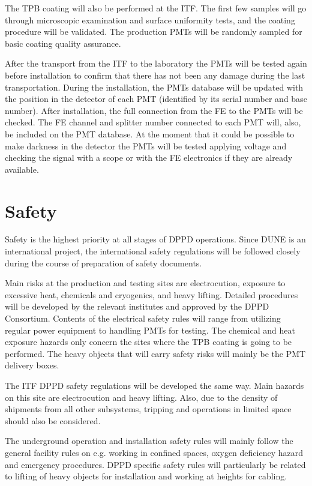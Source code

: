 The TPB coating will also be performed at the ITF. The first few samples will go through microscopic examination and surface uniformity tests, and the coating procedure will be validated. The production PMTs will be randomly sampled for basic coating quality assurance.

After the transport from the ITF to the laboratory the PMTs will be tested again before installation to confirm that there has not been any damage during the last transportation. During the installation, the PMTs database will be updated with the position in the detector of each PMT (identified by its serial number and base number). After installation, the full connection from the FE to the PMTs will be checked. The FE channel and splitter number connected to each PMT will, also, be included on the PMT database. At the moment that it could be possible to make darkness in the detector the PMTs will be tested applying voltage and checking the signal with a scope or with the FE electronics if they are already available.

\section{Safety}
\label{sec:fddp-pd-11}

Safety is the highest priority at all stages of DPPD operations. Since DUNE is an international project, the international safety regulations will be followed closely during the course of preparation of safety documents.

Main risks at the production and testing sites are electrocution, exposure to excessive heat, chemicals and cryogenics, and heavy lifting. Detailed procedures will be developed by the relevant institutes and approved by the DPPD Consortium. Contents of the electrical safety rules will range from utilizing regular power equipment to handling PMTs for testing. The chemical and heat exposure hazards only concern the sites where the TPB coating is going to be performed. The heavy objects that will carry safety risks will mainly be the PMT delivery boxes.

The ITF DPPD safety regulations will be developed the same way. Main hazards on this site are electrocution and heavy lifting. Also, due to the density of shipments from all other subsystems, tripping and operations in limited space should also be considered.

The underground operation and installation safety rules will mainly follow the general facility rules on e.g. working in confined spaces, oxygen deficiency hazard and emergency procedures. DPPD specific safety rules will particularly be related to lifting of heavy objects for installation and working at heights for cabling.

